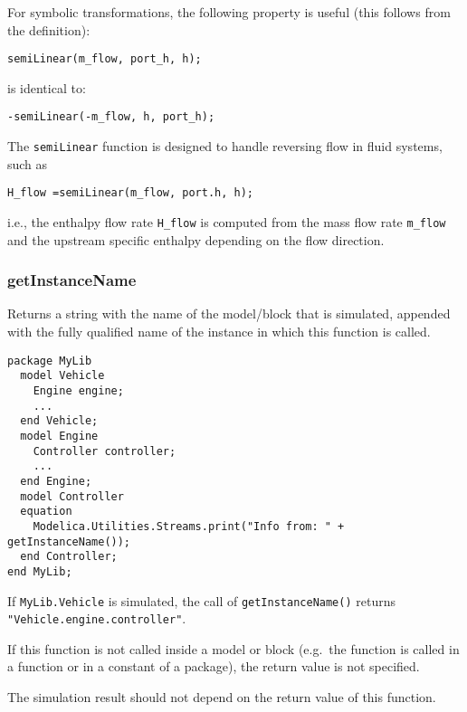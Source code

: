 \begin{nonnormative}
For symbolic transformations, the following property is useful
(this follows from the definition):
\begin{lstlisting}[language=modelica]
semiLinear(m_flow, port_h, h);
\end{lstlisting}
is identical to:
\begin{lstlisting}[language=modelica]
-semiLinear(-m_flow, h, port_h);
\end{lstlisting}

The \lstinline!semiLinear! function is designed to handle reversing
flow in fluid systems, such as
\begin{lstlisting}[language=modelica]
H_flow =semiLinear(m_flow, port.h, h);
\end{lstlisting}
i.e., the enthalpy flow rate \lstinline!H_flow! is computed from the
mass flow rate \lstinline!m_flow! and the upstream specific enthalpy
depending on the flow direction.
\end{nonnormative}

\subsubsection{getInstanceName}

Returns a string with the name of the model/block that is simulated,
appended with the fully qualified name of the instance in which this
function is called.

\begin{example}
\begin{lstlisting}[language=modelica]
package MyLib
  model Vehicle
    Engine engine;
    ...
  end Vehicle;
  model Engine
    Controller controller;
    ...
  end Engine;
  model Controller
  equation
    Modelica.Utilities.Streams.print("Info from: " + getInstanceName());
  end Controller;
end MyLib;
\end{lstlisting}
If \lstinline!MyLib.Vehicle! is simulated, the call of \lstinline!getInstanceName()!
returns \lstinline!"Vehicle.engine.controller"!.
\end{example}

If this function is not called inside a model or block (e.g.\ the
function is called in a function or in a constant of a package), the
return value is not specified.

\begin{nonnormative}
The simulation result should not depend on the return value of this function.
\end{nonnormative}


